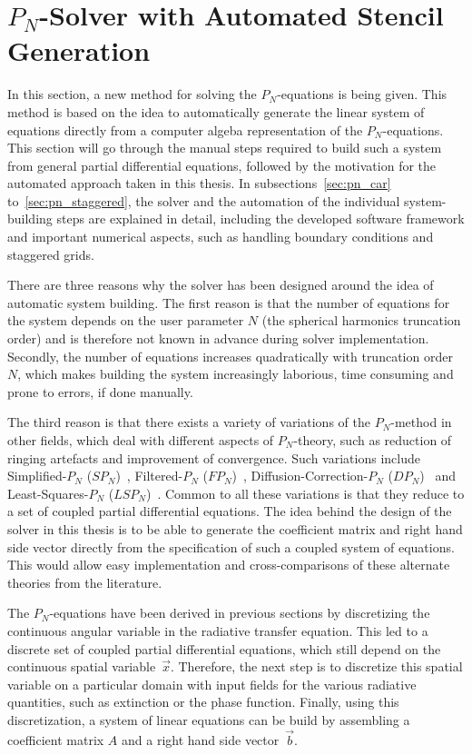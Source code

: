 \section{$P_N$-Solver with Automated Stencil Generation}
\label{sec:pn_solver}

In this section, a new method for solving the $P_N$-equations is being given. This method is based on the idea to automatically generate the linear system of equations directly from a computer algeba representation of the $P_N$-equations. This section will go through the manual steps required to build such a system from general partial differential equations, followed by the motivation for the automated approach taken in this thesis. In subsections~\ref{sec:pn_car} to~\ref{sec:pn_staggered}, the solver and the automation of the individual system-building steps are explained in detail, including the developed software framework and important numerical aspects, such as handling boundary conditions and staggered grids.

There are three reasons why the solver has been designed around the idea of automatic system building. The first reason is that the number of equations for the system depends on the user parameter $N$ (the spherical harmonics truncation order) and is therefore not known in advance during solver implementation. Secondly, the number of equations increases quadratically with truncation order $N$, which makes building the system increasingly laborious, time consuming and prone to errors, if done manually.

The third reason is that there exists a variety of variations of the $P_N$-method in other fields, which deal with different aspects of $P_N$-theory, such as reduction of ringing artefacts and improvement of convergence. Such variations include Simplified-$P_N$ ($SP_N$)~\cite{Ryan10}, Filtered-$P_N$ ($FP_N$)~\cite{Radice13}, Diffusion-Correction-$P_N$ ($DP_N$)~\cite{Schaefer11} and Least-Squares-$P_N$ ($LSP_N$)~\cite{Hansen14}. Common to all these variations is that they reduce to a set of coupled partial differential equations. The idea behind the design of the solver in this thesis is to be able to generate the coefficient matrix and right hand side vector directly from the specification of such a coupled system of equations. This would allow easy implementation and cross-comparisons of these alternate theories from the literature.

The $P_N$-equations have been derived in previous sections by discretizing the continuous angular variable in the radiative transfer equation. This led to a discrete set of coupled partial differential equations, which still depend on the continuous spatial variable~$\vec{x}$. Therefore, the next step is to discretize this spatial variable on a particular domain with input fields for the various radiative quantities, such as extinction or the phase function. Finally, using this discretization, a system of linear equations can be build by assembling a coefficient matrix $A$ and a right hand side vector~$\vec{b}$.

